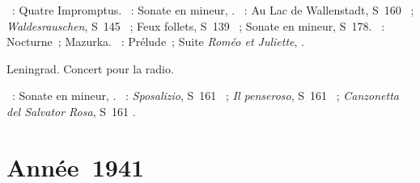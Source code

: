 \begin{description}
 \textsc{\Schubert{}}~: Quatre Impromptus.
 \textsc{\Beethoven{}}~: Sonate en \kC \Sharp mineur,  .
 \textsc{\Liszt{}}~: Au Lac de Wallenstadt, S~160 ~;
 \emph{Waldesrauschen}, S~145 ~; Feux follets, S~139 ~;
 Sonate en \kB mineur, S~178.
 \textsc{\Chopin{}}~: Nocturne~; Mazurka.
 \textsc{\Prokofiev{}}~: Prélude~; Suite \emph{Roméo et Juliette},
 .
 \item[\DateWithWeekDay{1940-12-26}]
 Leningrad.
 Concert pour la radio.

 \textsc{\Beethoven{}}~: Sonate en \kC \Sharp mineur,  .
 \textsc{\Liszt{}}~: \emph{Sposalizio}, S~161 ~; \emph{Il
 penseroso}, S~161 ~; \emph{Canzonetta del Salvator Rosa}, S~161
 .
\end{description}

\section{Année~1941}

